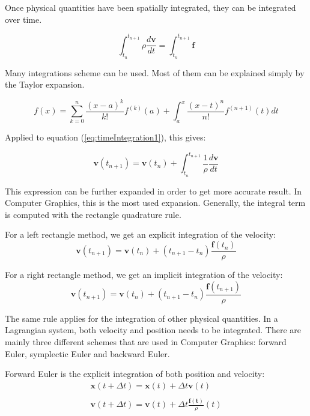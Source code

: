 Once physical quantities have been spatially integrated, they can be integrated over time. 

\begin{equation}
\label{eq:timeIntegration1}
\displaystyle
\int_{t_{n}}^{t_{n+1}}
\rho \frac{d\mathbf{v}}{dt}
=
\int_{t_{n}}^{t_{n+1}}\mathbf{f}
\end{equation}

Many integrations scheme can be used. Most of them can be explained simply by the Taylor expansion.

\begin{equation}
\label{eq:taylorExpansion}
\displaystyle
f(x) = \sum_{k=0}^{n}\frac{\left(x-a\right)^{k}}{k!}f^{(k)}(a) + \int_{a}^{x}\frac{\left(x-t\right)^{n}}{n!}f^{(n+1)}(t)dt
\end{equation}

Applied to equation (\ref{eq:timeIntegration1}), this gives:

\begin{equation}
\label{eq:timeIntegration2}
\displaystyle
\mathbf{v}(t_{n+1}) = \mathbf{v}(t_{n}) + \int_{t_{n}}^{t_{n+1}}\frac{1}{\rho}\frac{d\mathbf{v}}{dt}
\end{equation}

This expression can be further expanded in order to get more accurate result. In Computer Graphics, this is the most used expansion. Generally, the integral term is computed with the rectangle quadrature rule.

For a left rectangle method, we get an explicit integration of the velocity:
\begin{equation}
\label{eq:explicitIntegration}
\mathbf{v}(t_{n+1}) = \mathbf{v}(t_{n}) + \left(t_{n+1}-t_{n}\right) \frac{\mathbf{f}(t_{n})}{\rho}
\end{equation}

For a right rectangle method, we get an implicit integration of the velocity:
\begin{equation}
\label{eq:implicitIntegration}
\mathbf{v}(t_{n+1}) = \mathbf{v}(t_{n}) + \left(t_{n+1}-t_{n}\right) \frac{\mathbf{f}(t_{n+1})}{\rho}
\end{equation}

The same rule applies for the integration of other physical quantities. In a Lagrangian system, both velocity and position needs to be integrated. There are mainly three different schemes that are used in Computer Graphics: forward Euler, symplectic Euler and backward Euler.

Forward Euler is the explicit integration of both position and velocity:
\begin{equation}
\label{eq:explicitEuler}
\begin{array}{l}
\displaystyle \mathbf{x}(t+\Delta t) = \mathbf{x}(t) + \Delta t \mathbf{v}(t) \\ \\
\displaystyle \mathbf{v}(t+\Delta t) = \mathbf{v}(t) + \Delta t \frac{\mathbf{f(t)}}{\rho}(t)
\end{array}
\end{equation}

